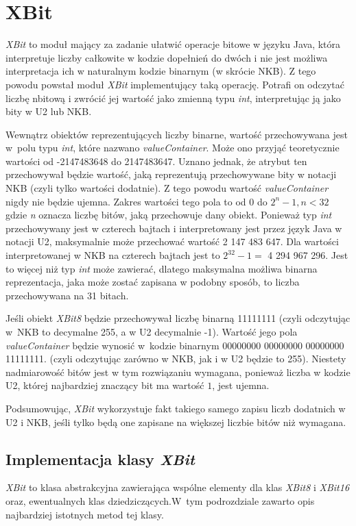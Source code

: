 \section{XBit}

\emph{XBit} to moduł mający za zadanie ułatwić operacje bitowe w języku Java, która interpretuje liczby całkowite w kodzie dopełnień do dwóch i nie jest możliwa interpretacja ich w naturalnym kodzie binarnym (w skrócie NKB). Z tego powodu powstał moduł \emph{XBit} implementujący taką operację. Potrafi on odczytać liczbę n{\dywiz}bitową i zwrócić jej wartość jako zmienną typu \emph{int}, interpretując ją jako bity w U2 lub NKB.


Wewnątrz obiektów reprezentujących liczby binarne, wartość przechowywana jest w~polu typu \emph{int}, które nazwano \emph{valueContainer}. Może ono przyjąć teoretycznie wartości od -2147483648 do 2147483647. Uznano jednak, że atrybut ten przechowywał będzie wartość, jaką reprezentują przechowywane bity w notacji NKB (czyli tylko wartości dodatnie). Z tego powodu wartość \emph{valueContainer} nigdy nie będzie ujemna. \newline
Zakres wartości tego pola to od 0 do $ 2^{n}-1, n<32 $ gdzie \emph{n} oznacza liczbę bitów, jaką przechowuje dany obiekt. Ponieważ typ \emph{int} przechowywany jest w czterech bajtach i interpretowany jest przez język Java w notacji U2, maksymalnie może przechować wartość 2 147 483 647. Dla wartości interpretowanej w NKB na czterech bajtach jest to \newline $2^{32}-1 =$ 4 294 967 296. Jest to więcej niż typ \emph{int} może zawierać, dlatego maksymalna możliwa binarna reprezentacja, jaka może zostać zapisana w podobny sposób, to liczba przechowywana na 31 bitach.

Jeśli obiekt \emph{XBit8} będzie przechowywał liczbę binarną 11111111 (czyli odczytując w~NKB to decymalne 255, a w U2 decymalnie -1). Wartość jego pola \emph{valueContainer} będzie wynosić w~kodzie binarnym
00000000 00000000 00000000 11111111. (czyli odczytując zarówno w NKB, jak i w U2 będzie to 255). Niestety nadmiarowość bitów jest w tym rozwiązaniu wymagana, ponieważ liczba w kodzie U2, której najbardziej znaczący bit ma wartość $1$, jest ujemna. 

Podsumowując, \emph{XBit} wykorzystuje fakt takiego samego zapisu liczb dodatnich w U2 i NKB, jeśli tylko będą one zapisane na większej liczbie bitów niż wymagana.


\subsection{Implementacja klasy \emph{XBit}}
\emph{XBit} to klasa abstrakcyjna zawierająca wspólne elementy dla klas \emph{XBit8} i \emph{XBit16} oraz, ewentualnych klas dziedziczących.W~tym podrozdziale zawarto opis najbardziej istotnych metod tej klasy.


